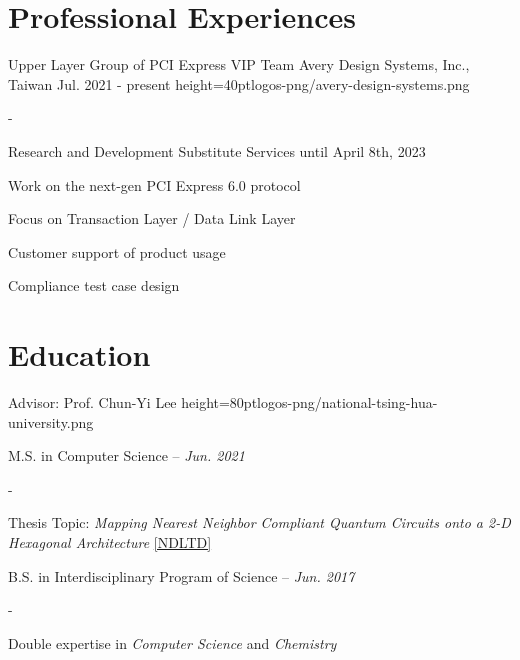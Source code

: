 \documentclass{cvclass}
\begin{document}
\makeinfo


\section{Professional Experiences}

    {Upper Layer Group of PCI Express VIP Team}
    {Avery Design Systems, Inc., Taiwan}
    {Jul. 2021 - present}
    {height=40pt}{logos-png/avery-design-systems.png}
\begin{plainitemize}{-}
    \item Research and Development Substitute Services until April 8th, 2023
    \item Work on the next-gen PCI Express 6.0 protocol
    \item Focus on Transaction Layer / Data Link Layer
    \item Customer support of product usage
    \item Compliance test case design
\end{plainitemize}


\section{Education}

        {Advisor: Prof. Chun-Yi Lee}
        {height=80pt}{logos-png/national-tsing-hua-university.png}{
    \item M.S. in Computer Science -- \textit{Jun. 2021}
    \begin{plainitemize}{-}
        \item Thesis Topic: \textit{Mapping Nearest Neighbor Compliant Quantum Circuits onto a 2-D Hexagonal Architecture} \href{https://hdl.handle.net/11296/dpttkc}{[NDLTD]}
    \end{plainitemize}
    \item B.S. in Interdisciplinary Program of Science -- \textit{Jun. 2017}
    \begin{plainitemize}{-}
        \item Double expertise in \textit{Computer Science} and \textit{Chemistry}
    \end{plainitemize}}
\end{document}
